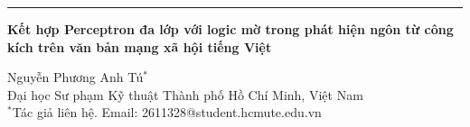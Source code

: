 \documentclass[11pt,a4paper]{article}
\begin{document}
\vspace{4pt}
\noindent\rule{\textwidth}{0.6pt}

\vspace{8pt}
\begin{center}
{\fontsize{13}{16}\selectfont\bfseries
Kết hợp Perceptron đa lớp với logic mờ trong phát hiện ngôn từ công kích trên văn bản mạng xã hội tiếng Việt\par}
\vspace{6pt}
Nguyễn Phương Anh Tú$^{*}$\\
Đại học Sư phạm Kỹ thuật Thành phố Hồ Chí Minh, Việt Nam\\
$^{*}$Tác giả liên hệ. Email: 2611328@student.hcmute.edu.vn
\end{center}
\end{document}
